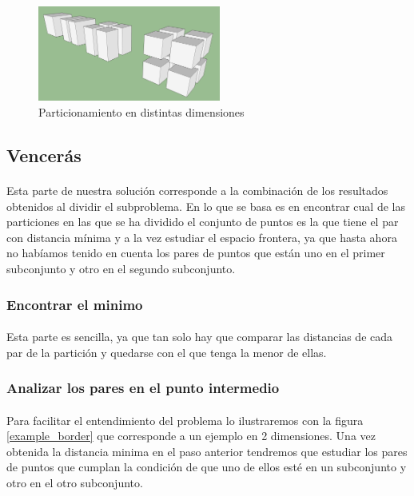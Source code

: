 \documentclass{article}
\begin{document}
	\begin{figure}[ht!]
		\centering
		\includegraphics[width=60mm]{cube_division_2.jpg}
		\caption{Particionamiento en distintas dimensiones \label{different_dim}}
	\end{figure}


	\subsection{Vencerás}
		\paragraph{}
		Esta parte de nuestra solución corresponde a la combinación de los resultados obtenidos al dividir el subproblema. En lo que se basa es en encontrar cual de las particiones en las que se ha dividido el conjunto de puntos es la que tiene el par con distancia mínima y a la vez estudiar el espacio frontera, ya que hasta ahora no habíamos tenido en cuenta los pares de puntos que están uno en el primer subconjunto y otro en el segundo subconjunto.
		\subsubsection{Encontrar el minimo}

			\paragraph{}
			Esta parte es sencilla, ya que tan solo hay que comparar las distancias de cada par de la partición y quedarse con el que tenga la menor de ellas.

		\subsubsection{Analizar los pares en el punto intermedio}

			\paragraph{}
			Para facilitar el entendimiento del problema lo ilustraremos con la figura \ref{example_border} que corresponde a un ejemplo en 2 dimensiones. Una vez obtenida la distancia minima en el paso anterior tendremos que estudiar los pares de puntos que cumplan la condición de que uno de ellos esté en un subconjunto y otro en el otro subconjunto.
\end{document}
